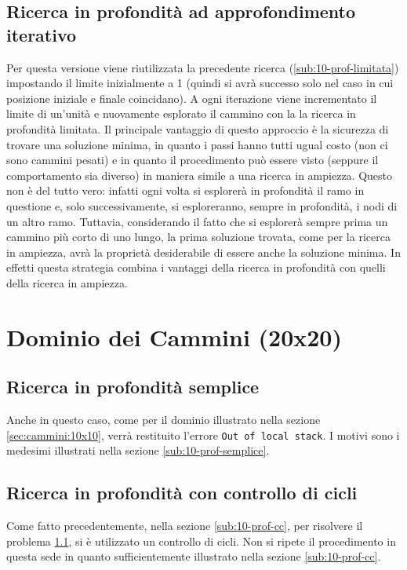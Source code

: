 \subsection{Ricerca in profondità ad approfondimento iterativo} \label{sub:10-prof-it}
Per questa versione viene riutilizzata la precedente ricerca (\ref{sub:10-prof-limitata}) impostando il limite inizialmente a 1 (quindi si avrà successo solo nel caso in cui posizione iniziale e finale coincidano). A ogni iterazione viene incrementato il limite di un'unità e nuovamente esplorato il cammino con la la ricerca in profondità limitata. Il principale vantaggio di questo approccio è la sicurezza di trovare una soluzione minima, in quanto i passi hanno tutti ugual costo (non ci sono cammini pesati) e in quanto il procedimento può essere visto (seppure il comportamento sia diverso) in maniera simile a una ricerca in ampiezza. Questo non è del tutto vero: infatti ogni volta si esplorerà in profondità il ramo in questione e, solo successivamente, si esploreranno, sempre in profondità, i nodi di un altro ramo. Tuttavia, considerando il fatto che si esplorerà sempre prima un cammino più corto di uno lungo, la prima soluzione trovata, come per la ricerca in ampiezza, avrà la proprietà desiderabile di essere anche la soluzione minima. In effetti questa strategia combina i vantaggi della ricerca in profondità con quelli della ricerca in ampiezza.

\section{Dominio dei Cammini (20x20)}

\subsection{Ricerca in profondità semplice} \label{sub:20-prof-semplice}
Anche in questo caso, come per il dominio illustrato nella sezione \ref{sec:cammini:10x10}, verrà restituito l'errore \texttt{Out of local stack}. I motivi sono i medesimi illustrati nella sezione \ref{sub:10-prof-semplice}.

\subsection{Ricerca in profondità con controllo di cicli} \label{sub:20-prof-cc}
Come fatto precedentemente, nella sezione \ref{sub:10-prof-cc}, per risolvere il problema \ref{sub:20-prof-semplice}, si è utilizzato un controllo di cicli. Non si ripete il procedimento in questa sede in quanto sufficientemente illustrato nella sezione \ref{sub:10-prof-cc}.

